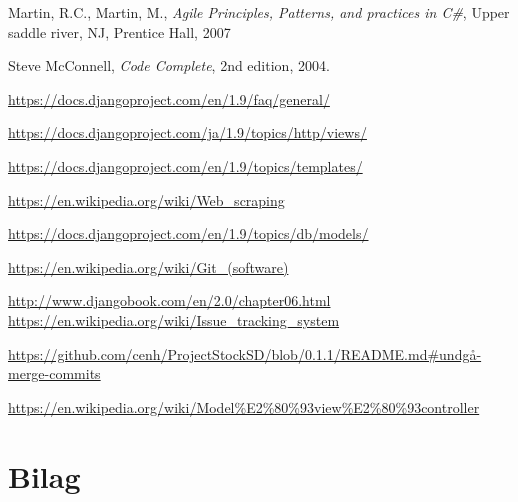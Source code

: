 \documentclass[12pt]{article}
\begin{document}
\newpage
\begin{thebibliography}{9}

	Martin, R.C., Martin, M.,
	\emph{Agile Principles, Patterns, and practices in C\#},
	Upper saddle river, NJ, Prentice Hall,
	2007

	Steve McConnell,
	\emph{Code Complete},
	2nd edition,
	2004.

	\url{https://docs.djangoproject.com/en/1.9/faq/general/}

	\url{https://docs.djangoproject.com/ja/1.9/topics/http/views/}

	\url{https://docs.djangoproject.com/en/1.9/topics/templates/}

    \url{https://en.wikipedia.org/wiki/Web_scraping}

    \url{https://docs.djangoproject.com/en/1.9/topics/db/models/}

    \url{https://en.wikipedia.org/wiki/Git_(software)}

    \url{http://www.djangobook.com/en/2.0/chapter06.html}
    \url{https://en.wikipedia.org/wiki/Issue_tracking_system}

    \url{https://github.com/cenh/ProjectStockSD/blob/0.1.1/README.md#undgå-merge-commits}

    \url{https://en.wikipedia.org/wiki/Model%E2%80%93view%E2%80%93controller}

\end{thebibliography}

\newpage
\section{Bilag}
\label{sec:bilag}
\end{document}
